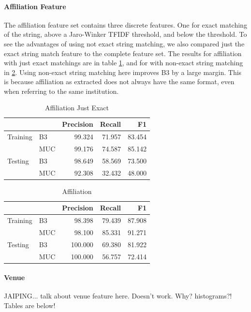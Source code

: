 \documentclass[twocolumn,letterpaper]{article}
\begin{document}
\paragraph{Affiliation Feature} %
\label{par:affiliation_feature}
The affiliation feature set contains three discrete features. One for exact matching of the string, above a Jaro-Winker TFIDF threshold, and below the threshold. To see the advantages of using not exact string matching, we also compared just the exact string match feature to the complete feature set. The results for affiliation with just exact matchings are in table \ref{tab:exact}, and for with non-exact string matching in \ref{tab:aff}. Using non-exact string matching here improves B3 by a large margin. This is because affiliation as extracted does not always have the same format, even when referring to the same institution.

\begin{table}[ht]
\centering
\begin{tabular}{l || l | r r r}
 & & Precision & Recall & F1 \\ \hline
Training & B3 & 99.324 & 71.957 & 83.454 \\
 & MUC & 99.176 & 74.587 & 85.142\\ \hline
Testing & B3 & 98.649 & 58.569 & 73.500 \\
 & MUC & 92.308 & 32.432 & 48.000 \\
\end{tabular}
\caption{Affiliation Just Exact}
\label{tab:exact}
\end{table}

\begin{table}[ht]
\centering
\begin{tabular}{l || l | r r r}
 & & Precision & Recall & F1 \\ \hline
Training & B3 & 98.398 & 79.439 & 87.908 \\
 & MUC & 98.100 & 85.331 & 91.271\\ \hline
Testing & B3 & 100.000 & 69.380 & 81.922 \\
 & MUC & 100.000 & 56.757 & 72.414 \\
\end{tabular}
\caption{Affiliation}
\label{tab:aff}
\end{table}

\paragraph{Venue} %
\label{par:venue}
JAIPING... talk about venue feature here. Doesn't work. Why? histograms?! Tables are below!
\end{document}
